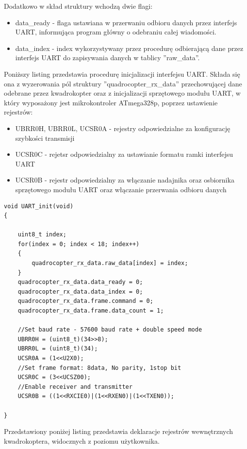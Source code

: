 Dodatkowo w skład struktury wchodzą dwie flagi:
\begin{itemize}
	\item data\_ready - flaga ustawiana w przerwaniu odbioru danych przez interfejs UART, informująca program główny o odebraniu całej wiadomości.
	\item data\_index - index wykorzystywany przez procedurę odbierającą dane przez interfejs UART do zapisywania danych w tablicy ''raw\_data''. 
\end{itemize}

Poniższy listing przedstawia procedurę inicjalizacji interfejsu UART. Składa się ona z wyzerowania pól struktury ''quadrocopter\_rx\_data'' przechowującej dane odebrane przez kwadrokopter oraz z inicjalizacji sprzętowego modułu UART, w który wyposażony jest mikrokontroler ATmega328p, poprzez ustawienie rejestrów:
\begin{itemize}
	\item UBRR0H, UBRR0L, UCSR0A - rejestry odpowiedzialne za konfigurację szybkości transmisji
	\item UCSR0C - rejetsr odpowiedzialny za ustawianie formatu ramki interfejsu UART
	\item UCSR0B - rejestr odpowiedzialny za włączanie nadajnika oraz osbiornika sprzętowego modułu UART oraz włączanie przerwania odbioru danych
\end{itemize}

\begin{lstlisting}
void UART_init(void)
{

    uint8_t index;
    for(index = 0; index < 18; index++)
    {
        quadrocopter_rx_data.raw_data[index] = index;
    }
    quadrocopter_rx_data.data_ready = 0;
    quadrocopter_rx_data.data_index = 0;
    quadrocopter_rx_data.frame.command = 0;
    quadrocopter_rx_data.frame.data_count = 1;

	//Set baud rate - 57600 baud rate + double speed mode
	UBRR0H = (uint8_t)(34>>8);
	UBRR0L = (uint8_t)(34);
	UCSR0A = (1<<U2X0);
	//Set frame format: 8data, No parity, 1stop bit
	UCSR0C = (3<<UCSZ00);
	//Enable receiver and transmitter
	UCSR0B = ((1<<RXCIE0)|(1<<RXEN0)|(1<<TXEN0));

}
\end{lstlisting}

Przedstawiony poniżej listing przedstawia deklaracje rejestrów wewnętrznych kwadrokoptera, widocznych z poziomu użytkownika. 

